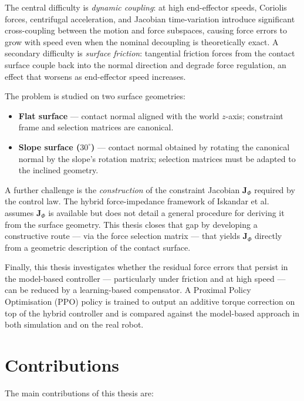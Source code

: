 \documentclass[
	german,%
	accentcolor=9c,%
	ruledheaders=section,%
	class=report,%
	thesis={type=bachelor},%
	fontsize=11pt,%
	parskip=half-,%
	custommargins=true,%
	marginpar=false,%
]{tudapub}
\begin{document}
The central difficulty is \emph{dynamic coupling}: at high end-effector speeds,
Coriolis forces, centrifugal acceleration, and Jacobian time-variation introduce
significant cross-coupling between the motion and force subspaces, causing force
errors to grow with speed even when the nominal decoupling is theoretically exact.
A secondary difficulty is \emph{surface friction}: tangential friction forces
from the contact surface couple back into the normal direction and degrade force
regulation, an effect that worsens as end-effector speed increases.

The problem is studied on two surface geometries:
\begin{itemize}
    \item \textbf{Flat surface} — contact normal aligned with the world
          $z$-axis; constraint frame and selection matrices are canonical.
    \item \textbf{Slope surface ($30^\circ$)} — contact normal obtained by
          rotating the canonical normal by the slope's rotation matrix;
          selection matrices must be adapted to the inclined geometry.
\end{itemize}

A further challenge is the \emph{construction} of the constraint Jacobian
$\mathbf{J}_\Phi$ required by the control law.
The hybrid force-impedance framework of Iskandar et al.~\cite{iskandar2023}
assumes $\mathbf{J}_\Phi$ is available but does not detail a general
procedure for deriving it from the surface geometry.
This thesis closes that gap by developing a constructive route — via the
force selection matrix — that yields $\mathbf{J}_\Phi$ directly from
a geometric description of the contact surface.

Finally, this thesis investigates whether the residual force errors that
persist in the model-based controller — particularly under friction and at
high speed — can be reduced by a learning-based compensator.
A Proximal Policy Optimisation (PPO) policy is trained to output an additive
torque correction on top of the hybrid controller and is compared against
the model-based approach in both simulation and on the real robot.


\section{Contributions}

The main contributions of this thesis are:
\end{document}

